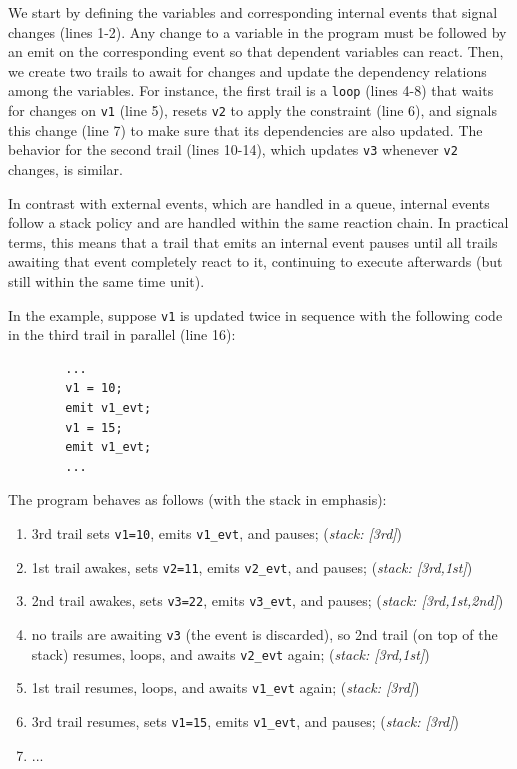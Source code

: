 \documentclass[11pt,a4paper]{article}
\newcommand{\2}{\;\;}
\newcommand{\5}{\;\;\;\;\;}
\newcommand{\code}[1] {{\small{\texttt{#1}}}}
\begin{document}
We start by defining the variables and corresponding internal events that 
signal changes (lines 1-2).
Any change to a variable in the program must be followed by an emit on the 
corresponding event so that dependent variables can react.
Then, we create two trails to await for changes and update the dependency 
relations among the variables.
For instance, the first trail is a \code{loop} (lines 4-8) that waits for 
changes on \code{v1} (line 5), resets \code{v2} to apply the constraint (line 
6), and signals this change (line 7) to make sure that its dependencies are 
also updated.
The behavior for the second trail (lines 10-14), which updates \code{v3} 
whenever \code{v2} changes, is similar.

In contrast with external events, which are handled in a queue, internal events 
follow a stack policy and are handled within the same reaction chain.
In practical terms, this means that a trail that emits an internal event pauses 
until all trails awaiting that event completely react to it, continuing to 
execute afterwards (but still within the same time unit).

In the example, suppose \code{v1} is updated twice in sequence with the 
following code in the third trail in parallel (line 16):
{\small
\begin{verbatim}
        ...
        v1 = 10;
        emit v1_evt;
        v1 = 15;
        emit v1_evt;
        ...

\end{verbatim}
}
The program behaves as follows (with the stack in emphasis):

{\small
\begin{enumerate}
\setlength{\itemsep}{0pt}
\item 3rd trail sets \code{v1=10}, emits \code{v1\_evt}, and pauses;
    (\emph{stack: [3rd]})
\item 1st trail awakes, sets \code{v2=11}, emits \code{v2\_evt}, and pauses;
    (\emph{stack: [3rd,1st]})
\item 2nd trail awakes, sets \code{v3=22}, emits \code{v3\_evt}, and pauses;
    (\emph{stack: [3rd,1st,2nd]})
\item no trails are awaiting \code{v3} (the event is discarded), so 2nd trail 
    (on top of the stack) resumes, loops, and awaits \code{v2\_evt} again;
    (\emph{stack: [3rd,1st]})
\item 1st trail resumes, loops, and awaits \code{v1\_evt} again;
    (\emph{stack: [3rd]})
\item 3rd trail resumes, sets \code{v1=15}, emits \code{v1\_evt}, and pauses;
    (\emph{stack: [3rd]})
\item ...
\end{enumerate}
}
\end{document}
